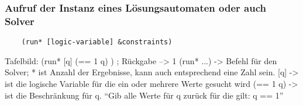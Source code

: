 \subsubsection{Aufruf der Instanz eines Lösungsautomaten oder auch Solver}

\begin{lstlisting}
    (run* [logic-variable] &constraints)
\end{lstlisting}


Tafelbild: (run* [q] (== 1 q) ) ; Rückgabe --> 1
(run* ...) -> Befehl für den Solver; * ist Anzahl der Ergebnisse, kann auch entsprechend eine Zahl sein.
[q] -> ist die logische Variable für die ein oder mehrere Werte gesucht wird
(== 1 q) -> ist die Beschränkung für q.
“Gib alle Werte für q zurück für die gilt: q == 1”
